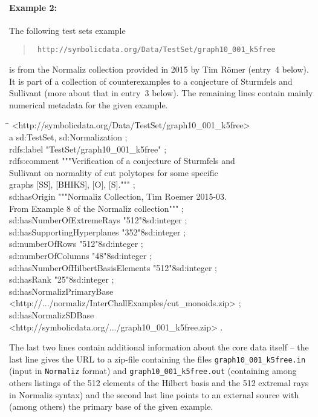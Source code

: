 \documentclass{mathincs}
\newenvironment{code}{\par\tt\begin{tabbing}
\hskip12pt\=\hskip12pt\=\hskip12pt\=\hskip12pt\=\hskip5cm\=\hskip5cm\=\kill}
{\end{tabbing}\normalsize}
\begin{document}
\paragraph{Example 2:}
The following test sets example
\begin{quote}\tt
  http://symbolicdata.org/Data/TestSet/graph10\_001\_k5free
\end{quote}
is from the Normaliz collection provided in 2015 by Tim R\"omer (entry~4
below).  It is part of a collection of counterexamples to a conjecture of
Sturmfels and Sullivant (more about that in entry~3 below).  The remaining
lines contain mainly numerical metadata for the given example.
\begin{code}
  <http://symbolicdata.org/Data/TestSet/graph10\_001\_k5free>\+\\
  a sd:TestSet, sd:Normalization ;\\
rdfs:label "TestSet/graph10\_001\_k5free" ;\\
rdfs:comment """Verification of a conjecture of Sturmfels and 
\\\>Sullivant on normality of cut polytopes for some specific
\\\> graphs [SS], [BHIKS], [O], [S].""" ;\\
sd:hasOrigin """Normaliz Collection, Tim Roemer 2015-03.
\\\>From Example 8 of the Normaliz collection""" ;\\
sd:hasNumberOfExtremeRays "512"^^xsd:integer ;\\
sd:hasSupportingHyperplanes "352"^^xsd:integer ;\\
sd:numberOfRows "512"^^xsd:integer ;\\
sd:numberOfColumns "48"^^xsd:integer ;\\
sd:hasNumberOfHilbertBasisElements "512"^^xsd:integer ;\\
sd:hasRank "25"^^xsd:integer ;\\
sd:hasNormalizPrimaryBase
\\\><http://.../normaliz/InterChallExamples/cut\_monoids.zip> ;\\
sd:hasNormalizSDBase
\\\><http://symbolicdata.org/.../graph10\_001\_k5free.zip> .
\end{code}
The last two lines contain additional information about the core data itself --
the last line gives the URL to a zip-file containing the files
\texttt{graph10\_001\_k5free.in} (input in \texttt{Normaliz} format) and
\texttt{graph10\_001\_k5free.out} (containing among others listings of the 512
elements of the Hilbert basis and the 512 extremal rays in Normaliz syntax) and
the second last line points to an external source with (among others) the
primary base of the given example.
\end{document}
